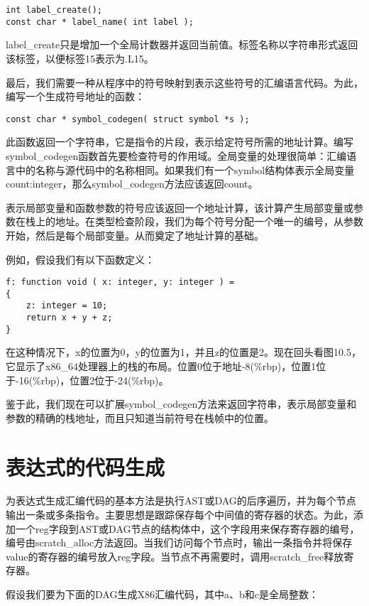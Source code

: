 \documentclass[cn,11pt,chinese]{elegantbook}
\begin{document}
\begin{verbatim}
int label_create();
const char * label_name( int label );
\end{verbatim}

label\_create只是增加一个全局计数器并返回当前值。标签名称以字符串形式返回该标签，以便标签15表示为.L15。

最后，我们需要一种从程序中的符号映射到表示这些符号的汇编语言代码。为此，编写一个生成符号地址的函数：

\begin{verbatim}
const char * symbol_codegen( struct symbol *s );
\end{verbatim}

此函数返回一个字符串，它是指令的片段，表示给定符号所需的地址计算。编写symbol\_codegen函数首先要检查符号的作用域。全局变量的处理很简单：汇编语言中的名称与源代码中的名称相同。如果我们有一个symbol结构体表示全局变量count:integer，那么symbol\_codegen方法应该返回count。

表示局部变量和函数参数的符号应该返回一个地址计算，该计算产生局部变量或参数在栈上的地址。在类型检查阶段，我们为每个符号分配一个唯一的编号，从参数开始，然后是每个局部变量。从而奠定了地址计算的基础。

例如，假设我们有以下函数定义：

\begin{verbatim}
f: function void ( x: integer, y: integer ) =
{
    z: integer = 10;
    return x + y + z;
}
\end{verbatim}

在这种情况下，x的位置为0，y的位置为1，并且z的位置是2。现在回头看图10.5，它显示了x86\_64处理器上的栈的布局。位置0位于地址-8(\%rbp)，位置1位于-16(\%rbp)，位置2位于-24(\%rbp)。

鉴于此，我们现在可以扩展symbol\_codegen方法来返回字符串，表示局部变量和参数的精确的栈地址，而且只知道当前符号在栈帧中的位置。

\section{表达式的代码生成}

为表达式生成汇编代码的基本方法是执行AST或DAG的后序遍历，并为每个节点输出一条或多条指令。主要思想是跟踪保存每个中间值的寄存器的状态。为此，添加一个reg字段到AST或DAG节点的结构体中，这个字段用来保存寄存器的编号，编号由scratch\_alloc方法返回。当我们访问每个节点时，输出一条指令并将保存value的寄存器的编号放入reg字段。当节点不再需要时，调用scratch\_free释放寄存器。

假设我们要为下面的DAG生成X86汇编代码，其中a、b和c是全局整数：
\end{document}
